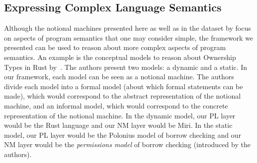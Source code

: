 %

\subsection{Expressing Complex Language Semantics}
\label{sec:more-complexity}

Although
the notional machines presented here as well as in the dataset by \citet{fincherNotionalMachinesComputing2020}
focus on aspects of program semantics that one may consider simple,
the framework we presented can be used to reason about more complex aspects of program semantics.
%
An example
is
the conceptual models
to reason about Ownership Types in Rust by~\citet{crichtonGroundedConceptualModel2023}.
The authors present two models: a dynamic and a static.
In our framework,
each model can be seen as a notional machine.
The authors divide each model into a formal model (about which formal statements can be made), which would correspond to the abstract representation of the notional machine,
and an informal model, which would correspond to the concrete representation of the notional machine.
%
In the dynamic model,
our PL layer would be the Rust language
and
our NM layer would be Miri.
%
In the static model,
our PL layer would be the Polonius model of borrow checking
and
our NM layer would be the \emph{permissions model} of borrow checking
(introduced by the authors).


